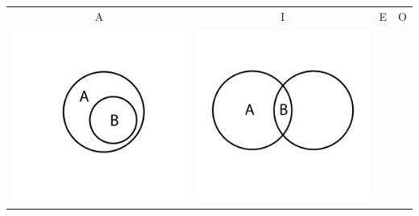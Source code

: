 \documentclass[12pt,a4paper]{report}
\begin{document}
\begin{table}[h!]
  \centering
  \begin{tabular}{  c  c  c  c }
    A & I & E & O\\
    \begin{minipage}{.22\textwidth}
      \includegraphics[width=\linewidth]{AEuler}
    \end{minipage}
    &
    \begin{minipage}{.22\textwidth}
      \includegraphics[width=\linewidth]{IEuler}

\end{minipage}
\end{tabular}
\end{table}
\end{document}
